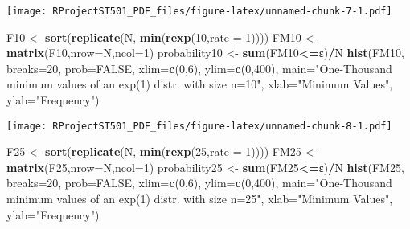 \documentclass[
]{article}
\newenvironment{Shaded}{\begin{snugshade}}{\end{snugshade}}
\newcommand{\DataTypeTok}[1]{\textcolor[rgb]{0.13,0.29,0.53}{#1}}
\newcommand{\DecValTok}[1]{\textcolor[rgb]{0.00,0.00,0.81}{#1}}
\newcommand{\KeywordTok}[1]{\textcolor[rgb]{0.13,0.29,0.53}{\textbf{#1}}}
\newcommand{\NormalTok}[1]{#1}
\newcommand{\OperatorTok}[1]{\textcolor[rgb]{0.81,0.36,0.00}{\textbf{#1}}}
\newcommand{\OtherTok}[1]{\textcolor[rgb]{0.56,0.35,0.01}{#1}}
\newcommand{\StringTok}[1]{\textcolor[rgb]{0.31,0.60,0.02}{#1}}
\begin{document}
\texttt{[image: RProjectST501\_PDF\_files/figure-latex/unnamed-chunk-7-1.pdf]}

\begin{Shaded}
\begin{Highlighting}[]
\NormalTok{F10 <-}\StringTok{ }\KeywordTok{sort}\NormalTok{(}\KeywordTok{replicate}\NormalTok{(N, }\KeywordTok{min}\NormalTok{(}\KeywordTok{rexp}\NormalTok{(}\DecValTok{10}\NormalTok{,}\DataTypeTok{rate =} \DecValTok{1}\NormalTok{))))}
\NormalTok{FM10 <-}\StringTok{ }\KeywordTok{matrix}\NormalTok{(F10,}\DataTypeTok{nrow=}\NormalTok{N,}\DataTypeTok{ncol=}\DecValTok{1}\NormalTok{)}
\NormalTok{probability10 <-}\StringTok{ }\KeywordTok{sum}\NormalTok{(FM10}\OperatorTok{<=}\NormalTok{ε)}\OperatorTok{/}\NormalTok{N}
\KeywordTok{hist}\NormalTok{(FM10, }\DataTypeTok{breaks=}\DecValTok{20}\NormalTok{, }\DataTypeTok{prob=}\OtherTok{FALSE}\NormalTok{, }\DataTypeTok{xlim=}\KeywordTok{c}\NormalTok{(}\DecValTok{0}\NormalTok{,}\DecValTok{6}\NormalTok{), }\DataTypeTok{ylim=}\KeywordTok{c}\NormalTok{(}\DecValTok{0}\NormalTok{,}\DecValTok{400}\NormalTok{), }\DataTypeTok{main=}\StringTok{"One-Thousand minimum values of an exp(1) distr. with size n=10"}\NormalTok{, }\DataTypeTok{xlab=}\StringTok{"Minimum Values"}\NormalTok{, }\DataTypeTok{ylab=}\StringTok{"Frequency"}\NormalTok{)}
\end{Highlighting}
\end{Shaded}

\texttt{[image: RProjectST501\_PDF\_files/figure-latex/unnamed-chunk-8-1.pdf]}

\begin{Shaded}
\begin{Highlighting}[]
\NormalTok{F25 <-}\StringTok{ }\KeywordTok{sort}\NormalTok{(}\KeywordTok{replicate}\NormalTok{(N, }\KeywordTok{min}\NormalTok{(}\KeywordTok{rexp}\NormalTok{(}\DecValTok{25}\NormalTok{,}\DataTypeTok{rate =} \DecValTok{1}\NormalTok{))))}
\NormalTok{FM25 <-}\StringTok{ }\KeywordTok{matrix}\NormalTok{(F25,}\DataTypeTok{nrow=}\NormalTok{N,}\DataTypeTok{ncol=}\DecValTok{1}\NormalTok{)}
\NormalTok{probability25 <-}\StringTok{ }\KeywordTok{sum}\NormalTok{(FM25}\OperatorTok{<=}\NormalTok{ε)}\OperatorTok{/}\NormalTok{N}
\KeywordTok{hist}\NormalTok{(FM25, }\DataTypeTok{breaks=}\DecValTok{20}\NormalTok{, }\DataTypeTok{prob=}\OtherTok{FALSE}\NormalTok{, }\DataTypeTok{xlim=}\KeywordTok{c}\NormalTok{(}\DecValTok{0}\NormalTok{,}\DecValTok{6}\NormalTok{), }\DataTypeTok{ylim=}\KeywordTok{c}\NormalTok{(}\DecValTok{0}\NormalTok{,}\DecValTok{400}\NormalTok{), }\DataTypeTok{main=}\StringTok{"One-Thousand minimum values of an exp(1) distr. with size n=25"}\NormalTok{, }\DataTypeTok{xlab=}\StringTok{"Minimum Values"}\NormalTok{, }\DataTypeTok{ylab=}\StringTok{"Frequency"}\NormalTok{)}
\end{Highlighting}
\end{Shaded}
\end{document}
